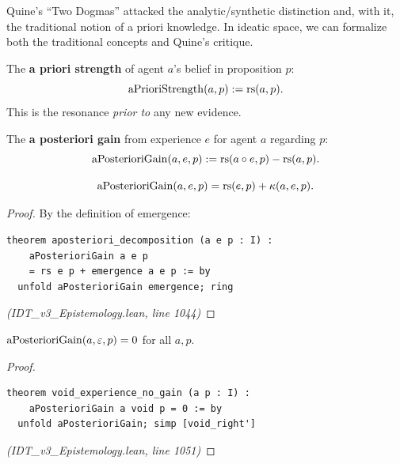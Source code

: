 Quine's ``Two Dogmas'' attacked the analytic/synthetic distinction and, with it,
the traditional notion of a priori knowledge. In ideatic space, we can formalize
both the traditional concepts and Quine's critique.

\begin{definition}
\label{def:a-priori}
The \textbf{a priori strength} of agent $a$'s belief in proposition $p$:
\[
  \mathrm{aPrioriStrength}(a, p) := \mathrm{rs}(a, p).
\]
This is the resonance \emph{prior to} any new evidence.
\end{definition}

\begin{definition}
\label{def:a-posteriori}
The \textbf{a posteriori gain} from experience $e$ for agent $a$ regarding $p$:
\[
  \mathrm{aPosterioriGain}(a, e, p) := \mathrm{rs}(a \circ e, p) - \mathrm{rs}(a, p).
\]
\end{definition}

\begin{theorem}
\label{thm:a-posteriori-decomp}
\[
  \mathrm{aPosterioriGain}(a, e, p) = \mathrm{rs}(e, p) + \kappa(a, e, p).
\]
\end{theorem}

\begin{proof}
By the definition of emergence:
\begin{lstlisting}
theorem aposteriori_decomposition (a e p : I) :
    aPosterioriGain a e p
    = rs e p + emergence a e p := by
  unfold aPosterioriGain emergence; ring
\end{lstlisting}
\textit{(IDT\_v3\_Epistemology.lean, line 1044)}
\end{proof}

\begin{theorem}
\label{thm:void-experience}
$\mathrm{aPosterioriGain}(a, \varepsilon, p) = 0$ for all $a, p$.
\end{theorem}

\begin{proof}
\begin{lstlisting}
theorem void_experience_no_gain (a p : I) :
    aPosterioriGain a void p = 0 := by
  unfold aPosterioriGain; simp [void_right']
\end{lstlisting}
\textit{(IDT\_v3\_Epistemology.lean, line 1051)}
\end{proof}

